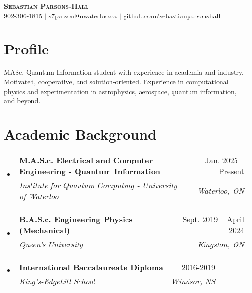 \documentclass[letterpaper,11pt]{article}
\makeatletter
\newcommand{\resumeSubheading}[4]{
  \vspace{-2pt}\item
    \begin{tabular*}{0.97\textwidth}[t]{l@{\extracolsep{\fill}}r}
      \textbf{#1} & #2 \\
      \textit{\small#3} & \textit{\small #4} \\
    \end{tabular*}\vspace{-7pt}
}
\newcommand{\resumeSubHeadingListStart}{\begin{itemize}[leftmargin=0.15in, label={}]}
\newcommand{\resumeSubHeadingListEnd}{\end{itemize}}
\makeatother
\begin{document}

\begin{center}
    \textbf{\huge \scshape Sebastian Parsons-Hall} \\ \vspace{1pt}
    902-306-1815 $|$ \href{s7parson@uwaterloo.ca}{\underline{s7parson@uwaterloo.ca}} $|$ 
    \href{https://github.com/sebastianparsonshall}{\underline{github.com/sebastianparsonshall}}
\end{center}

\section*{Profile}
MASc. Quantum Information student with experience in academia and industry. Motivated, cooperative, and solution-oriented. 
Experience in computational physics and experimentation in astrophysics, aerospace, quantum information, and beyond. 

\vspace{-0.3cm}
\section{Academic Background}

\resumeSubHeadingListStart

\resumeSubheading {M.A.S.c. Electrical and Computer Engineering - Quantum Information}{Jan. 2025 -- Present}
    {Institute for Quantum Computing - University of Waterloo}
    {Waterloo, ON}

  \vspace{0.5cm}
\resumeSubheading {B.A.S.c. Engineering Physics (Mechanical)}{Sept. 2019 -- April 2024}
    {Queen's University}
    {Kingston, ON}


\vspace{0.5cm}
\resumeSubheading {International Baccalaureate Diploma}{2016-2019}
    {King's-Edgehill School}
    {Windsor, NS}
\resumeSubHeadingListEnd
\end{document}

